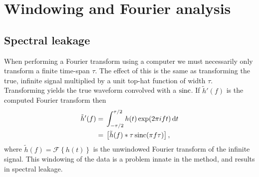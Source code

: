 \chapter{Windowing and Fourier analysis}\label{ap:window}

\section{Spectral leakage}

When performing a Fourier transform using a computer we must necessarily only transform a finite time-span $\tau$. The effect of this is the same as transforming the true, infinite signal multiplied by a unit top-hat function of width $\tau$. Transforming yields the true waveform convolved with a $\operatorname{sinc}$. If $\tilde{h}'(f)$ is the computed Fourier transform then
\begin{align}
\tilde{h}'(f) = {} & \int_{-\tau/2}^{\tau/2}{h(t)\exp({2\pi i ft})}\,\mathrm{d}{t} \\
 = {} & \left[\tilde{h}(f) \ast \tau \operatorname{sinc}(\pi f\tau)\right],
\end{align}
where $\tilde{h}(f) = \mathscr{F}\left\{h(t)\right\}$ is the unwindowed Fourier transform of the infinite signal. This windowing of the data is a problem innate in the method, and results in spectral leakage.


